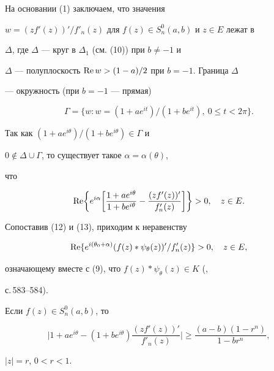 \begin{pf}
 


На основании (1) заключаем, что значения 


$w=(z f'(z))'/f'_n(z)$ для $f(z)\in S^0_n(a,b)$ и $z\in E$ лежат в 


$\Delta$, где $\Delta$ --- круг в $\Delta_1$ (см. (10)) при $b\ne -1$ и 


$\Delta$ --- полуплоскость $\operatorname{Re} w>(1-a)/2$ при $b=-1$. Граница $\Delta$ 


--- окружность (при $b=-1$ --- прямая) 


$$ 


\Gamma=\{w:w=(1+ae^{it})/(1+be^{it}),\ 0\le t<2\pi\}. 


$$ 


Так как $(1+ae^{i\theta})/(1+be^{i\theta})\in\Gamma$ и 


$0\notin\Delta\cup\Gamma$, то существует такое $\alpha=\alpha(\theta)$, 


что 


\begin{equation} 


\re\biggl\{e^{i\alpha}\bigg[\frac{1+ae^{i\theta}}{1+be^{i\theta}}- 


\frac{(z f'(z))'}{f'_n(z)}\bigg] 


\biggr\}>0,\quad z\in E. 


\end{equation} 


 


Сопоставив (12) и (13), приходим к неравенству 


$$ 


\re\{e^{i(\theta_0+\alpha)}(f(z)*\psi_\theta(z))'/ 


f'_n(z)\}>0,\quad z\in E, 


$$ 


означающему вместе с (9), что $f(z)*\psi_\theta(z)\in K$ (\cite{4}, 


с.\,583--584). 


\end{pf} 


 


\begin{lem} 


Если $f(z)\in S^0_n(a,b)$, то


\begin{equation} 


\bigg|1+ae^{i\theta}-(1+be^{i\theta}) 


\frac{(z f'(z))'}{f'_n(z)}\bigg|\ge 


\frac{(a-b)(1-r^n)}{1-b r^n}, 


\end{equation} 


$|z|=r$, $0<r<1$. 


\end{lem} 



